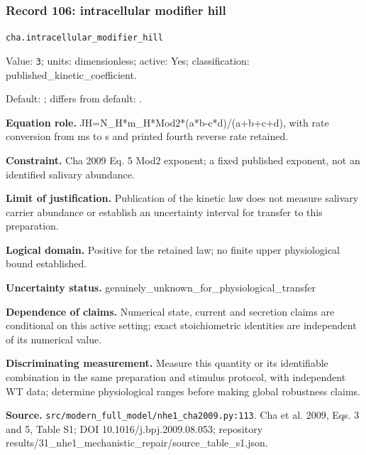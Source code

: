 \subsubsection*{Record 106: intracellular modifier hill}
{\small \nolinkurl{cha.intracellular_modifier_hill}\par

Value: \texttt{3}; units: dimensionless; active: Yes; classification: published\_kinetic\_coefficient.\par

Default: ; differs from default: .\par

\textbf{Equation role.} JH=N\_H*m\_H*Mod2*(a*b-c*d)/(a+b+c+d), with rate conversion from ms to s and printed fourth reverse rate retained.\par

\textbf{Constraint.} Cha 2009 Eq. 5 Mod2 exponent; a fixed published exponent, not an identified salivary abundance.\par

\textbf{Limit of justification.} Publication of the kinetic law does not measure salivary carrier abundance or establish an uncertainty interval for transfer to this preparation.\par

\textbf{Logical domain.} Positive for the retained law; no finite upper physiological bound established.\par

\textbf{Uncertainty status.} genuinely\_unknown\_for\_physiological\_transfer\par

\textbf{Dependence of claims.} Numerical state, current and secretion claims are conditional on this active setting; exact stoichiometric identities are independent of its numerical value.\par

\textbf{Discriminating measurement.} Measure this quantity or its identifiable combination in the same preparation and stimulus protocol, with independent WT data; determine physiological ranges before making global robustness claims.\par

\textbf{Source.} \nolinkurl{src/modern_full_model/nhe1_cha2009.py:113}. Cha et al. 2009, Eqs. 3 and 5, Table S1; DOI 10.1016/j.bpj.2009.08.053; repository results/31\_nhe1\_mechanistic\_repair/source\_table\_s1.json.\par}

